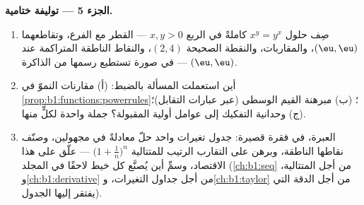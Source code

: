 \begin{problem}
\medskip
\noindent\textbf{الجزء 5 --- توليفة ختامية.}
\begin{enumerate}[resume]
  \item صِف  حلول $x^y = y^x$ كاملةً في
        الربع $x, y > 0$ --- القطر مع الفرع، وتقاطعهما
        $(\eu, \eu)$، والمقاربات، والنقطة الصحيحة
        $(2, 4)$، والنقاط الناطقة المتراكمة عند
        $(\eu, \eu)$ --- في صورة تستطيع رسمها من الذاكرة.
  \item أين استعملت المسألة بالضبط: (أ) مقارنات النموّ في
        \cref{prop:b1:functions:powerrules}؛ (ب)
        مبرهنة القيم الوسطى (عبر عبارات
        التقابل)؛ (ج) وحدانية التفكيك إلى عوامل
        أولية المقبولة؟ جملة واحدة لكلٍّ منها.
  \item العبرة، في فقرة قصيرة: جدول تغيرات واحد
        حلّ معادلةً في مجهولين، وصنّف نقاطها
        الناطقة، وبرهن على التقارب الرتيب للمتتالية
        $\bigl(1 + \frac1n\bigr)^n$ --- علّق على هذا الاقتصاد،
        وسمِّ أين يُصنَّع كل خيط لاحقًا في
        المجلد (\cref{ch:b1:seq} من أجل المتتالية،
        و\cref{ch:b1:derivative} من أجل جداول التغيرات،
        و\cref{ch:b1:taylor} من أجل الدقة التي يفتقر إليها الجدول).
\end{enumerate}
\end{problem}
